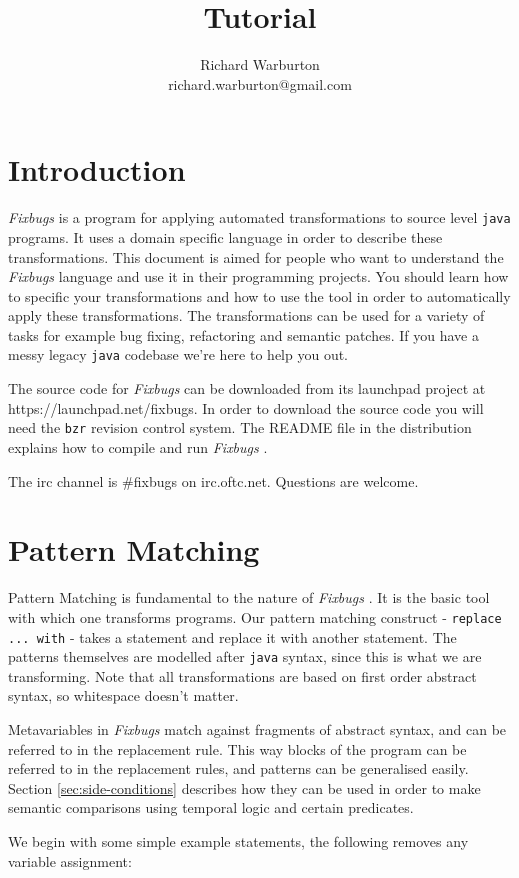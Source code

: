 \documentclass[final,twoside,12pt]{article}
\author{Richard Warburton\\richard.warburton@gmail.com}
\title{\fixbugs Tutorial}
\newcommand{\fixbugs}{{\emph{Fixbugs} }}
\newcommand{\java}{{\tt java} }
\newcommand{\replace}{{\tt replace ... with} }
\begin{document}
\maketitle
\tableofcontents
\newpage

\section{Introduction}
\fixbugs is a program for applying automated transformations to source level
\java programs.  It uses a domain specific language in order to describe these
transformations.  This document is aimed for people who want to understand the
\fixbugs language and use it in their programming projects.  You should learn
how to specific your transformations and how to use the tool in order to automatically
apply these transformations.  The transformations can be used for a variety of 
tasks for example bug fixing, refactoring and semantic patches.  If you have a messy
legacy \java codebase we're here to help you out.

The source code for \fixbugs can be downloaded from its launchpad project at
https://launchpad.net/fixbugs.  In order to download the source code you will need the
{\tt bzr} revision control system.  The README file in the distribution explains
how to compile and run \fixbugs.

The irc channel is \#fixbugs on irc.oftc.net.  Questions are welcome.

\section{Pattern Matching}
Pattern Matching is fundamental to the nature of \fixbugs.  It is the basic tool with
which one transforms programs.  Our pattern matching construct - \replace - takes a statement
and replace it with another statement.  The patterns themselves are modelled after \java syntax,
since this is what we are transforming.  Note that all transformations are based on first
order abstract syntax, so whitespace doesn't matter.

Metavariables in \fixbugs match against fragments of abstract syntax, and can be referred to in
the replacement rule.  This way blocks of the program can be referred to in the replacement rules,
and patterns can be generalised easily.  Section \ref{sec:side-conditions} describes how they can be
used in order to make semantic comparisons using temporal logic and certain predicates.

We begin with some simple example statements, the following removes any variable assignment:
\end{document}
